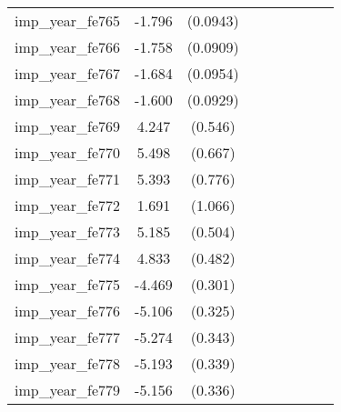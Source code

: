 {\begin{tabular}{l*{4}{cc}}
imp\_year\_fe765&   -1.796\sym{***}& (0.0943)&                  &         &                  &         &                  &         \\
imp\_year\_fe766&   -1.758\sym{***}& (0.0909)&                  &         &                  &         &                  &         \\
imp\_year\_fe767&   -1.684\sym{***}& (0.0954)&                  &         &                  &         &                  &         \\
imp\_year\_fe768&   -1.600\sym{***}& (0.0929)&                  &         &                  &         &                  &         \\
imp\_year\_fe769&    4.247\sym{***}&  (0.546)&                  &         &                  &         &                  &         \\
imp\_year\_fe770&    5.498\sym{***}&  (0.667)&                  &         &                  &         &                  &         \\
imp\_year\_fe771&    5.393\sym{***}&  (0.776)&                  &         &                  &         &                  &         \\
imp\_year\_fe772&    1.691         &  (1.066)&                  &         &                  &         &                  &         \\
imp\_year\_fe773&    5.185\sym{***}&  (0.504)&                  &         &                  &         &                  &         \\
imp\_year\_fe774&    4.833\sym{***}&  (0.482)&                  &         &                  &         &                  &         \\
imp\_year\_fe775&   -4.469\sym{***}&  (0.301)&                  &         &                  &         &                  &         \\
imp\_year\_fe776&   -5.106\sym{***}&  (0.325)&                  &         &                  &         &                  &         \\
imp\_year\_fe777&   -5.274\sym{***}&  (0.343)&                  &         &                  &         &                  &         \\
imp\_year\_fe778&   -5.193\sym{***}&  (0.339)&                  &         &                  &         &                  &         \\
imp\_year\_fe779&   -5.156\sym{***}&  (0.336)&                  &         &                  &         &                  &         \\

\end{tabular}}

